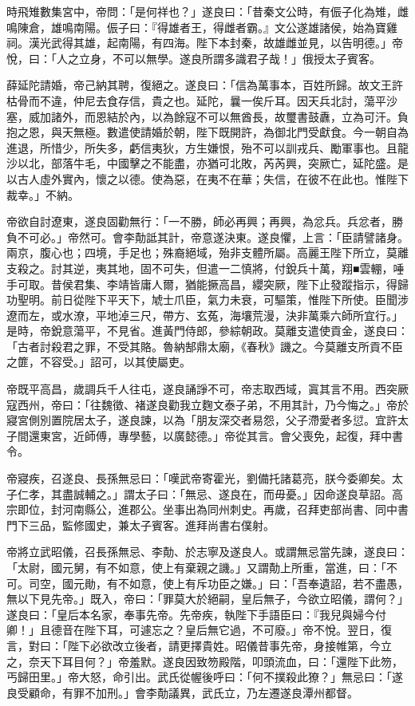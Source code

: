 \begin{pinyinscope}
 時飛雉數集宮中，帝問：「是何祥也？」遂良曰：「昔秦文公時，有侲子化為雉，雌鳴陳倉，雄鳴南陽。侲子曰：『得雄者王，得雌者霸。』文公遂雄諸侯，始為寶雞祠。漢光武得其雄，起南陽，有四海。陛下本封秦，故雄雌並見，以告明德。」帝悅，曰：「人之立身，不可以無學。遂良所謂多識君子哉！」俄授太子賓客。



 薛延陀請婚，帝己納其聘，復絕之。遂良曰：「信為萬事本，百姓所歸。故文王許枯骨而不違，仲尼去食存信，貴之也。延陀，曩一俟斤耳。因天兵北討，蕩平沙塞，威加諸外，而恩結於內，以為餘寇不可以無酋長，故璽書鼓纛，立為可汗。負抱之恩，與天無極。數遣使請婚於朝，陛下既開許，為御北門受獻食。今一朝自為進退，所惜少，所失多，虧信夷狄，方生嫌恨，殆不可以訓戎兵、勵軍事也。且龍沙以北，部落牛毛，中國擊之不能盡，亦猶可北敗，芮芮興，突厥亡，延陀盛。是以古人虛外實內，懷之以德。使為惡，在夷不在華；失信，在彼不在此也。惟陛下裁幸。」不納。



 帝欲自討遼東，遂良固勸無行：「一不勝，師必再興；再興，為忿兵。兵忿者，勝負不可必。」帝然可。會李勣詆其計，帝意遂決東。遂良懼，上言：「臣請譬諸身。兩京，腹心也；四境，手足也；殊裔絕域，殆非支體所屬。高麗王陛下所立，莫離支殺之。討其逆，夷其地，固不可失，但遣一二慎將，付銳兵十萬，翔■雲輣，唾手可取。昔侯君集、李靖皆庸人爾，猶能撅高昌，纓突厥，陛下止發蹤指示，得歸功聖明。前日從陛下平天下，虓士爪臣，氣力未衰，可驅策，惟陛下所使。臣聞涉遼而左，或水潦，平地淖三尺，帶方、玄菟，海壤荒漫，決非萬乘六師所宜行。」是時，帝銳意蕩平，不見省。進黃門侍郎，參綜朝政。莫離支遣使貢金，遂良曰：「古者討殺君之罪，不受其賂。魯納郜鼎太廟，《春秋》譏之。今莫離支所貢不臣之篚，不容受。」詔可，以其使屬吏。



 帝既平高昌，歲調兵千人往屯，遂良誦諍不可，帝志取西域，寘其言不用。西突厥寇西州，帝曰：「往魏徵、褚遂良勸我立麴文泰子弟，不用其計，乃今悔之。」帝於寢宮側別置院居太子，遂良諫，以為「朋友深交者易怨，父子滯愛者多愆。宜許太子間還東宮，近師傅，專學藝，以廣懿德。」帝從其言。會父喪免，起復，拜中書令。



 帝寢疾，召遂良、長孫無忌曰：「嘆武帝寄霍光，劉備托諸葛亮，朕今委卿矣。太子仁孝，其盡誠輔之。」謂太子曰：「無忌、遂良在，而毋憂。」因命遂良草詔。高宗即位，封河南縣公，進郡公。坐事出為同州刺史。再歲，召拜吏部尚書、同中書門下三品，監修國史，兼太子賓客。進拜尚書右僕射。



 帝將立武昭儀，召長孫無忌、李勣、於志寧及遂良人。或謂無忌當先諫，遂良曰：「太尉，國元舅，有不如意，使上有棄親之譏。」又謂勣上所重，當進，曰：「不可。司空，國元勛，有不如意，使上有斥功臣之嫌。」曰：「吾奉遺詔，若不盡愚，無以下見先帝。」既入，帝曰：「罪莫大於絕嗣，皇后無子，今欲立昭儀，謂何？」遂良曰：「皇后本名家，奉事先帝。先帝疾，執陛下手語臣曰：『我兒與婦今付卿！」且德音在陛下耳，可遽忘之？皇后無它過，不可廢。」帝不悅。翌日，復言，對曰：「陛下必欲改立後者，請更擇貴姓。昭儀昔事先帝，身接帷第，今立之，奈天下耳目何？」帝羞默。遂良因致笏殿階，叩頭流血，曰：「還陛下此笏，丐歸田里。」帝大怒，命引出。武氏從幄後呼曰：「何不撲殺此獠？」無忌曰：「遂良受顧命，有罪不加刑。」會李勣議異，武氏立，乃左遷遂良潭州都督。




\end{pinyinscope}

